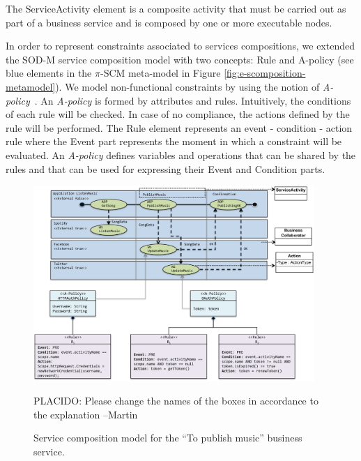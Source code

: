 \begin{itemizedTrivlist}
\item The {\sc ServiceActivity} element is a composite activity that must be carried out as part of a business service and is composed by one or more executable nodes.

\item In order to represent constraints associated to services compositions, we extended the SOD-M service composition model with two concepts: {\sc Rule} and {\sc A-policy} (see blue elements in the $\pi$-SCM meta-model in Figure \ref{fig:e-scomposition-metamodel}).
We model non-functional constraints by using the notion of {\em A-policy}~\cite{Espinosa-Oviedo2011a,CIC:eovszmc09c}.
An {\em A-policy} is formed by attributes and rules. 
Intuitively, the conditions of each rule will be checked.
In case of no compliance, the actions defined by the rule will be performed.
The {\sc Rule} element represents an event - condition - action rule where the {\sc Event} part represents the moment in which a constraint  will be evaluated.
An {\em A-policy} defines variables and operations that can be shared by the rules and that can be used for expressing their Event and Condition parts. 
\end{itemizedTrivlist}

\begin{figure}[t]%
\centering
\includegraphics[width=0.95\textwidth]{figs/e-composition-model}

{\color{red}\LARGE PLACIDO: Please change the names of the boxes in accordance to the explanation --Martin}

\caption{Service composition model for the ``To publish music'' business service.}
\label{fig:servicecompositionmodel}
\end{figure}

